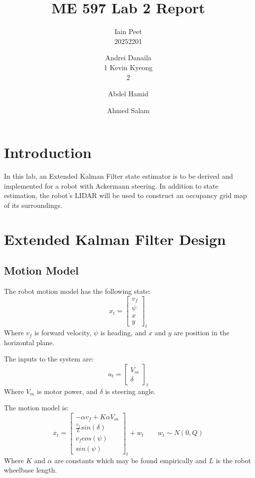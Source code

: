 \documentclass[11pt]{article} %
\title{ME 597 Lab 2 Report}
\author{Iain Peet\\20252201 
\and Andrei Danaila\\1 
Kevin Kyeong\\2
\and Abdel Hamid \and Ahmed Salam}
\begin{document}
\maketitle

\clearpage

\section{Introduction}

In this lab, an Extended Kalman Filter state estimator is to be derived and implemented for a robot with Ackermann steering.  In addition to state estimation, the robot's LIDAR will be used to construct an occupancy grid map of its surroundings.

\section{Extended Kalman Filter Design}

\subsection{Motion Model}
The robot motion model has the following state:
\begin{equation}
x_t = 
\left[ \begin{array}{c}
v_f \\
\psi \\
x \\
y
\end{array} \right] _t
\end{equation}
Where $v_f$ is forward velocity, $\psi$ is heading, and $x$ and $y$ are position in the horizontal plane.  

The inputs to the system are:
\begin{equation}
u_t =
\left[ \begin{array}{c}
V_m \\
\delta
\end{array} \right] _t
\end{equation}
Where $V_m$ is motor power, and $\delta$ is steering angle.

The motion model is:
\begin{equation}
\dot{x_t} = \left[ \begin{array}{c} 
-\alpha v_f + K \alpha V_m \\
\frac{v_f}{L} sin(\delta) \\
v_f cos( \psi ) \\
 sin( \psi )
\end{array} \right] _t + w_t \quad \quad w_t \sim N(0, Q)
\label{motion}
\end{equation}
Where  $K$ and $\alpha$ are constants which may be found empirically and $L$ is the robot wheelbase length.
\end{document}
